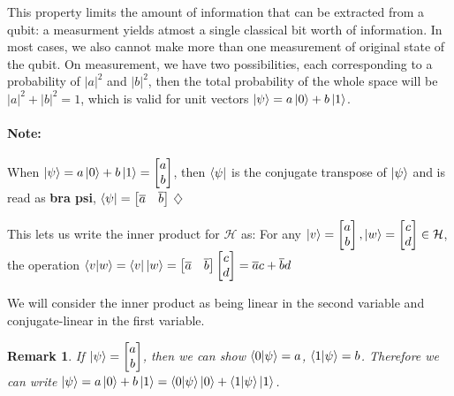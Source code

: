 \documentclass[12pt,twoside,fleqn]{report}
\theoremstyle{thmstyle}
\newtheorem{remark}{Remark}[chapter]
\newenvironment{note}{\paragraph{\textbf{Note:}}}{\hfill\ensuremath{\diamondsuit}}
\begin{document}
This property limits the amount of information that can be extracted from a qubit: a measurment yields atmost a single classical bit worth of information. In most cases, we also cannot make more than one measurement of original state of the qubit. On measurement, we have two possibilities, each corresponding to a probability of $|a|^2$ and $|b|^2$, then the total probability of the whole space will be $|a|^2 + |b|^2 = 1$, which is valid for unit vectors $\ket{\psi} = a \ket{0} + b \ket{1}$.

\begin{note}
    When $\ket{\psi} = a \ket{0} + b \ket{1} = \begin{bmatrix} a \\ b \end{bmatrix}$, then $\bra{\psi}$ is the conjugate transpose of $\ket{\psi}$ and is read as \textbf{bra psi}, $\bra{\psi} = \begin{bmatrix} \overline{a} & \overline{b}\end{bmatrix}$
\end{note}

This lets us write the inner product for $\mathcal{H}$ as:
For any $\ket{v} = \begin{bmatrix} a \\ b \end{bmatrix}, \ket{w} = \begin{bmatrix} c \\ d \end{bmatrix} \in \mathcal{H}$, the operation $\braket{v|w} = \bra{v}\ket{w} = \begin{bmatrix} \overline{a} & \overline{b} \end{bmatrix} \begin{bmatrix} c \\ d \end{bmatrix} = \overline{a} c + \overline{b} d $

We will consider the inner product as being linear in the second variable and conjugate-linear in the first variable.

\begin{remark}
If $\ket{\psi} = \begin{bmatrix} a \\ b \end{bmatrix}$, then we can show $\braket{0|\psi} = a$, $\braket{1|\psi} = b$.
Therefore we can write $\ket{\psi} = a \ket{0} + b \ket{1} = \braket{0|\psi} \ket{0} + \braket{1|\psi} \ket{1}$.
\end{remark}
\end{document}
